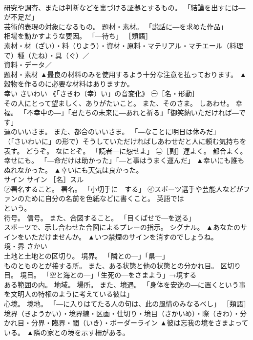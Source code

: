 \documentclass[8pt]{extreport}
\begin{document}
\begin{CJK}{UTF8}{min}
\\	研究や調査、または判断などを裏づける証拠とするもの。 「結論を出すには―が不足だ」 
\\	芸術的表現の対象になるもの。 題材・素材。 「説話に―を求めた作品」 
\\	相場を動かすような要因。 「―待ち」 ［類語］
\\	素材・材（ざい）・料（りよう）・資材・原料・マテリアル・マチエール（料理で）種（たね）・具（ぐ）／
\\	資料・データ／
\\	題材・素材	▲最良の材料のみを使用するよう十分な注意を払っております。 ▲穀物を作るのに必要な材料はありますか。
\\	幸い	さいわい	《「さきわ（幸）い」の音変化》 ㊀［名・形動］ 
\\	その人にとって望ましく、ありがたいこと。 また、そのさま。 しあわせ。 幸福。 「不幸中の―」「君たちの未来に―あれと祈る」「御笑納いただければ―です」 
\\	運のいいさま。 また、都合のいいさま。 「―なことに明日は休みだ」 
\\	（「さいわいに」の形で）そうしていただければしあわせだと人に頼む気持ちを表す。 どうぞ。 なにとぞ。 「読者―に恕せよ」 ㊁［副］運よく。 都合よく。 幸せにも。 「―命だけは助かった」「―と事はうまく運んだ」	▲幸いにも誰もぬれなかった。 ▲幸いにも天気は良かった。
\\	サイン	サイン	［名］スル 
\\	㋐署名すること。 署名。 「小切手に―する」 ㋑スポーツ選手や芸能人などがファンのために自分の名前を色紙などに書くこと。 英語では
\\	という。 
\\	符号。 信号。 また、合図すること。 「目くばせで―を送る」 
\\	スポーツで、示し合わせた合図によるプレーの指示。 シグナル。	▲あなたのサインをいただけませんか。 ▲いつ禁煙のサインを消すのでしょうね。
\\	境・界	さかい	
\\	土地と土地との区切り。 境界。 「隣との―」「県―」 
\\	ものとものとが接する所。 また、ある状態と他の状態との分かれ目。 区切り目。 境目。 「空と海との―」「生死の―をさまよう」→境する 
\\	ある範囲の内。 地域。 場所。 また、境遇。 「身体を安逸の―に置くという事を文明人の特権のように考えている彼は」 
\\	心境。 境地。 「―に入りはてたる人の句は、此の風情のみなるべし」 ［類語］
\\	境界（きようかい）・境界線・区画・仕切り・境目（さかいめ）・際（きわ）・分かれ目・分界・臨界・閾（いき）・ボーダーライン	▲彼は忘我の境をさまよっている。 ▲隣の家との境を示す柵がある。

\end{CJK}
\end{document}

